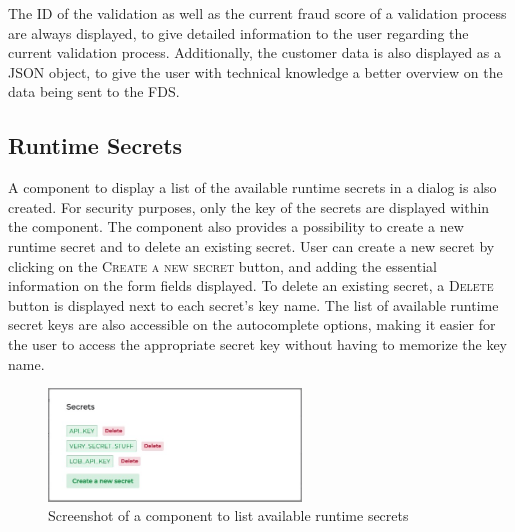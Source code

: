     The ID of the validation as well as the current fraud score of a validation process are always displayed, to give detailed information to the user regarding the current validation process. Additionally, the customer data is also displayed as a JSON object, to give the user with technical knowledge a better overview on the data being sent to the FDS. 
  
  \subsection{Runtime Secrets}

    A component to display a list of the available runtime secrets in a dialog is also created. For security purposes, only the key of the secrets are displayed within the component. The component also provides a possibility to create a new runtime secret and to delete an existing secret. User can create a new secret by clicking on the \textsc{Create a new secret} button, and adding the essential information on the form fields displayed. To delete an existing secret, a \textsc{Delete} button is displayed next to each secret's key name. The list of available runtime secret keys are also accessible on the autocomplete options, making it easier for the user to access the appropriate secret key without having to memorize the key name.
    
    \begin{figure}[!ht]
      \centering
      \includegraphics[width=0.6\textwidth]{images/ss_secrets.jpeg}
      \caption{Screenshot of a component to list available runtime secrets}
    \end{figure}
    